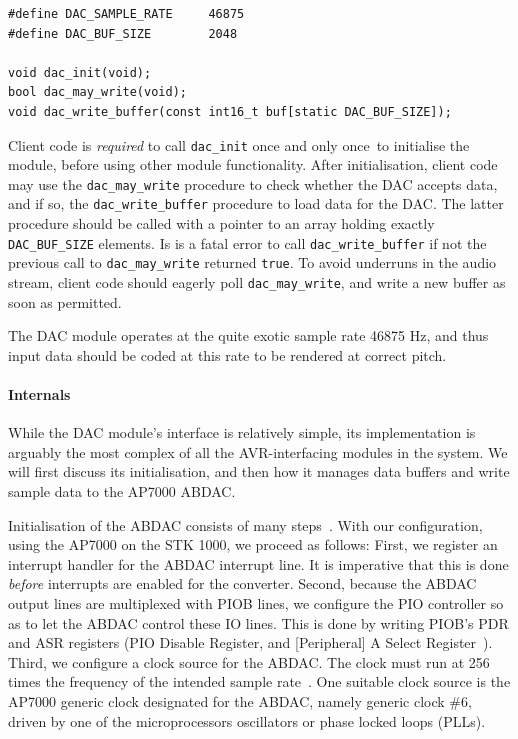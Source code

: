 \documentclass[a4paper,9pt]{article}
\newcommand{\isrc}[1]{\texttt{#1}}
\newcommand{\oaoo}{once and only once}
\begin{document}
\begin{lstlisting}
#define DAC_SAMPLE_RATE     46875
#define DAC_BUF_SIZE        2048

void dac_init(void);
bool dac_may_write(void);
void dac_write_buffer(const int16_t buf[static DAC_BUF_SIZE]);
\end{lstlisting}
Client code is \emph{required} to call \isrc{dac\_init} \oaoo~to
initialise the module, before using other module functionality.  After
initialisation, client code may use the \isrc{dac\_may\_write} procedure
to check whether the DAC accepts data, and if so, the
\isrc{dac\_write\_buffer} procedure to load data for the DAC. The latter
procedure should be called with a pointer to an array holding exactly
\isrc{DAC\_BUF\_SIZE} elements. Is is a fatal error to call
\isrc{dac\_write\_buffer} if not the previous call to
\isrc{dac\_may\_write} returned \isrc{true}.
To avoid underruns in the audio stream, client code should eagerly poll
\isrc{dac\_may\_write}, and write a new buffer as soon as permitted.

The DAC module operates at the quite exotic sample rate 46875 Hz, and thus
input data should be coded at this rate to be rendered at correct pitch.

\paragraph{Internals}
While the DAC module's interface is relatively simple, its implementation is
arguably the most complex of all the AVR-interfacing modules in the system.
We will first discuss its initialisation, and then how it manages data buffers
and write sample data to the AP7000 ABDAC.

Initialisation of the ABDAC consists of many steps~\cite[Chapter
26.5]{ap7000}. With our configuration, using the AP7000 on the STK 1000, we
proceed as follows:
First, we register an interrupt handler for the ABDAC interrupt line. It is
imperative that this is done \emph{before} interrupts are enabled for the
converter.
Second, because the ABDAC output lines are multiplexed with PIOB lines, we 
configure the PIO controller so as to let the ABDAC control these IO lines.
This is done by writing PIOB's PDR and ASR registers (PIO Disable Register,
and [Peripheral] A Select Register~\cite[Chapter 19.5.3]{ap7000}).
Third, we configure a clock source for the ABDAC. The clock must run at 256
times the frequency of the intended sample rate~\cite[Chapter 26.5]{ap7000}.
One suitable clock source is the AP7000 generic clock designated for the
ABDAC, namely generic clock \#6, driven by one of the microprocessors
oscillators or phase locked loops (PLLs). 
\end{document}
